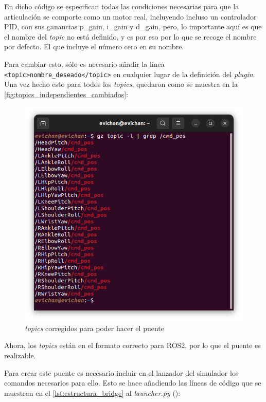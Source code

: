 En dicho código se especifican todas las condiciones necesarias para que la articulación se comporte como un motor real, incluyendo incluso un controlador PID, con sus ganancias p\_gain, i\_gain y d\_gain, pero, lo importante aquí es que el nombre del \textit{topic} no está definido, y es por eso por lo que se recoge el nombre por defecto. El que incluye el número cero en su nombre.

Para cambiar esto, sólo es necesario añadir la línea \texttt{<topic>nombre\_deseado</topic>} en cualquier lugar de la definición del \textit{plugin}. Una vez hecho esto para todos los \textit{topics}, quedaron como se muestra en la \autoref{fig:topics_independientes_cambiados}:

\begin{figure}[H]
  \centering
  \includegraphics[width=1\textwidth]{figures/cap_4/topics_gazebo_cambiados.png}
  \caption{\textit{topics} corregidos para poder hacer el puente}
  \label{fig:topics_independientes_cambiados}
\end{figure}

Ahora, los \textit{topics} están en el formato correcto para ROS2, por lo que el puente es realizable.

Para crear este puente es necesario incluir en el lanzador del simulador los comandos necesarios para ello. Esto se hace añadiendo las líneas de código que se muestran en el \autoref{lst:estructura_bridge} al \textit{launcher.py} (\cite{tutorial_bridge}):


